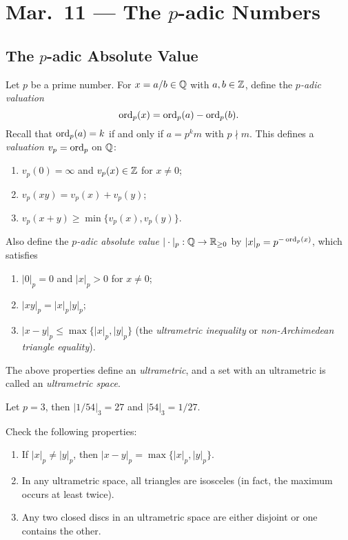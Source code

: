\chapter{Mar.~11 --- The \texorpdfstring{$p$}{p}-adic Numbers}

\section{The \texorpdfstring{$p$}{p}-adic Absolute Value}

\begin{definition}
  Let $p$ be a prime number.
  For $x = a / b \in \mathbb{Q}$ with $a, b \in \mathbb{Z}$, define
  the \emph{$p$-adic valuation}
  \[
    \operatorname{ord}_p(x) = \operatorname{ord}_p(a) - \operatorname{ord}_p(b).
  \]
  Recall that $\operatorname{ord}_p(a) = k$ if and only if
  $a = p^k m$ with $p \nmid m$.
  This defines a \emph{valuation} $v_p = \operatorname{ord}_p$ on $\mathbb{Q}$:
  \begin{enumerate}
    \item $v_p(0) = \infty$ and $v_p(x) \in \mathbb{Z}$ for
      $x \ne 0$;
    \item $v_p(xy) = v_p(x) + v_p(y)$;
    \item $v_p(x + y) \ge \min\{v_p(x), v_p(y)\}$.
  \end{enumerate}
  Also define the \emph{$p$-adic absolute value}
  $| \cdot |_{p} : \mathbb{Q} \to \mathbb{R}_{\ge 0}$ by
  $|x|_p = p^{-\operatorname{ord}_p(x)}$, which satisfies
  \begin{enumerate}
    \item $|0|_p = 0$ and $|x|_p > 0$ for $x \ne 0$;
    \item $|xy|_p = |x|_p |y|_p$;
    \item $|x - y|_p \le \max\{|x|_p, |y|_p\}$
      (the \emph{ultrametric inequality} or
      \emph{non-Archimedean triangle equality}).
  \end{enumerate}
  The above properties define an \emph{ultrametric}, and
  a set with an ultrametric is called an
  \emph{ultrametric space}.
\end{definition}

\begin{example}
  Let $p = 3$, then
  $|1 / 54|_{3} = 27$ and
  $|54|_3 = 1 / 27$.
\end{example}

\begin{exercise}
  Check the following properties:
  \begin{enumerate}
    \item If $|x|_p \ne |y|_p$, then
      $|x - y|_p = \max\{|x|_p, |y|_p\}$.
    \item In any ultrametric space, all triangles
      are isosceles (in fact, the maximum occurs
      at least twice).
    \item Any two closed discs in an ultrametric space
      are either disjoint or one contains the other.
  \end{enumerate}
\end{exercise}

